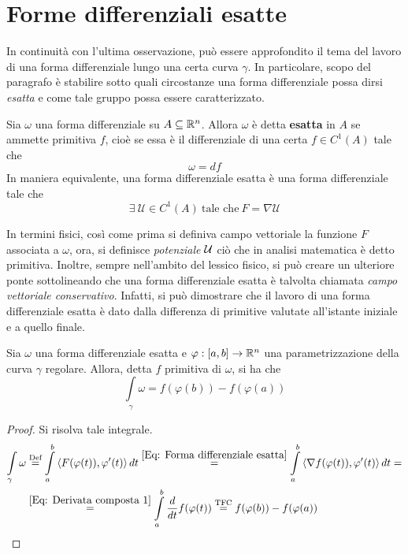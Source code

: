 \section{Forme differenziali esatte}
In continuità con l'ultima osservazione, può essere approfondito il tema del lavoro di una forma differenziale lungo una certa curva $\gamma$. In particolare, scopo del paragrafo è stabilire sotto quali circostanze una forma differenziale possa dirsi \textit{esatta} e come tale gruppo possa essere caratterizzato.
\begin{definition} \label{Def: Forma differenziale esatta}
    Sia $\omega$ una forma differenziale su $A \subseteq \mathbb{R}^n$. Allora $\omega$ è detta \textbf{esatta} in $A$ se ammette primitiva $f$, cioè se essa è il differenziale di una certa $f \in C^1(A)$ tale che 
    \begin{equation*}
        \omega = df
    \end{equation*}
    In maniera equivalente, una forma differenziale esatta è una forma differenziale tale che
    \begin{equation} \label{Eq: Forma differenziale esatta}
        \exists\ \mathcal{U} \in C^1(A) \ \text{tale che}\ F=\nabla\mathcal{U}
    \end{equation}
\end{definition}
In termini fisici, così come prima si definiva campo vettoriale la funzione $F$ associata a $\omega$, ora, si definisce \textit{potenziale} $\mathcal{U}$ ciò che in analisi matematica è detto primitiva. Inoltre, sempre nell'ambito del lessico fisico, si può creare un ulteriore ponte sottolineando che una forma differenziale esatta è talvolta chiamata \textit{campo vettoriale conservativo}. Infatti, si può dimostrare che il lavoro di una forma differenziale esatta è dato dalla differenza di primitive valutate all'istante iniziale e a quello finale.
\begin{theorem} \label{Teo: Integrale di forme differenziali esatte}
    Sia $\omega$ una forma differenziale esatta e $\varphi: [a, b] \to \mathbb{R}^n$ una parametrizzazione della curva $\gamma$ regolare. Allora, detta $f$ primitiva di $\omega$, si ha che 
    \begin{equation*}
        \int\limits_\gamma{\omega}= f(\varphi(b))-f(\varphi(a))
    \end{equation*}
\end{theorem}
\begin{proof}
    Si risolva tale integrale.
    \begin{equation*}
    \begin{aligned}
        \int\limits_{\gamma}{\omega} &\overset{\text{Def}}{=}\int\limits_{a}^{b}{\langle F(\varphi(t)), \varphi'(t)\rangle}\, dt \overset{\eqref{Eq: Forma differenziale esatta}}{=} \int\limits_{a}^{b}{\langle \nabla f(\varphi(t)), \varphi'(t) \rangle}\, dt =\\
        &\overset{\eqref{Eq: Derivata composta 1}}{=}\int\limits_{a}^{b}\frac{d}{dt}{f(\varphi(t))} \overset{\text{TFC}}{=} f(\varphi(b))- f(\varphi(a))
    \end{aligned}
    \end{equation*}
\end{proof}
